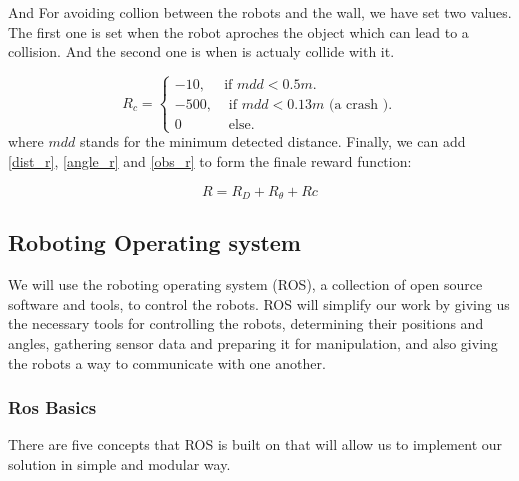 \documentclass[12pt]{extarticle}
\begin{document}
And For avoiding collion between the robots and the wall, we have set two values. The first one is set  when the robot aproches the object which can lead to a collision. And the second one is when is actualy collide  with it.


\begin{equation}  \label{obs_r}
  R_{c}=\begin{cases}
    -10, & \text{if $mdd< 0.5m$}.\\
    -500 , & \text{ if $mdd <0.13m$ (a crash )}.\\
    0 & \text{ else}.
  \end{cases}
\end{equation}
where $mdd$ stands for the minimum detected distance.\linebreak
Finally, we can add \ref{dist_r}, \ref{angle_r} and \ref{obs_r} to form the finale reward function: 

 
    \begin{equation} \label{final_r}
     R=R_{D}+R_{\theta}+R{c}
   \end{equation}






\pagebreak




























\subsection{Roboting Operating system}

We will use the roboting operating system (ROS), a collection of open source software and tools, to control the robots.
ROS will simplify our work by giving us the necessary tools for controlling the robots, determining their positions and angles, gathering sensor data and preparing it for manipulation, and also giving the robots a way to communicate with one another.

\subsubsection{Ros Basics}
There are five concepts that ROS is built on that will allow us to implement our solution in  simple and modular way.
\end{document}
